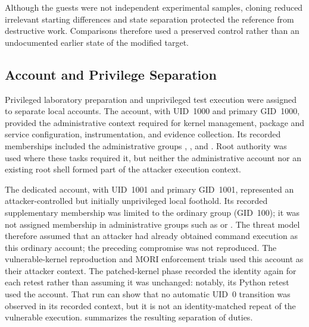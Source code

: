 Although the guests were not independent experimental samples, cloning reduced
irrelevant starting differences and state separation protected the reference
from destructive work. Comparisons therefore used a preserved control rather
than an undocumented earlier state of the modified target.

\subsection{Account and Privilege Separation}

Privileged laboratory preparation and unprivileged test execution were assigned
to separate local accounts. The  account, with UID~1000 and
primary GID~1000, provided the administrative context required for kernel
management, package and service configuration, instrumentation, and evidence
collection. Its recorded memberships included the administrative groups
, , and . Root authority was used where these
tasks required it, but neither the administrative account nor an existing root
shell formed part of the attacker execution context.

The dedicated  account, with UID~1001 and primary GID~1001,
represented an attacker-controlled but initially unprivileged local foothold.
Its recorded supplementary membership was limited to the ordinary
 group (GID~100); it was not assigned membership in administrative
groups such as  or . The threat model therefore assumed
that an attacker had already obtained command execution as this ordinary
account; the preceding compromise was not reproduced. The vulnerable-kernel
reproduction and MORI enforcement trials used this account as their attacker
context. The patched-kernel phase recorded the identity again for each retest
rather than assuming it was unchanged: notably, its Python retest used the
 account. That run can show that no automatic UID~0 transition
was observed in its recorded context, but it is not an identity-matched repeat
of the vulnerable  execution.  summarizes
the resulting separation of duties.

